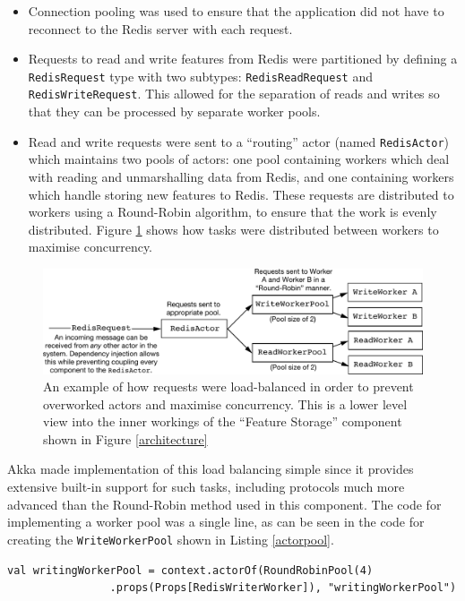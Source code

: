 \documentclass{l4proj}
\newcommand{\code}[1]{\texttt{#1}}
\begin{document}
        \begin{itemize}
        \item Connection pooling was used to ensure that the application did not have to reconnect to the Redis server with each request.
        \item Requests to read and write features from Redis were partitioned by defining a \code{RedisRequest} type with two subtypes: \code{RedisReadRequest} and \code{RedisWriteRequest}. This allowed for the separation of reads and writes so that they can be processed by separate worker pools.
        \item Read and write requests were sent to a ``routing'' actor (named \code{RedisActor}) which maintains two pools of actors: one pool containing workers which deal with reading and unmarshalling data from Redis, and one containing workers which handle storing new features to Redis. These requests are distributed to workers using a Round-Robin algorithm, to ensure that the work is evenly distributed. Figure \ref{loadbalancing} shows how tasks were distributed between workers to maximise concurrency.
        \end{itemize}


\begin{figure}
\centering
\includegraphics[scale=0.7]{loadbalancing.pdf}
\caption{An example of how requests were load-balanced in order to prevent overworked actors and maximise concurrency. This is a lower level view into the inner workings of the ``Feature Storage'' component shown in Figure \ref{architecture}}
\label{loadbalancing}
\end{figure}
        
        Akka made implementation of this load balancing simple since it provides extensive built-in support for such tasks, including protocols much more advanced than the Round-Robin method used in this component. The code for implementing a worker pool was a single line, as can be seen in the code for creating the \code{WriteWorkerPool} shown in Listing \ref{actorpool}.
        
        \begin{lstlisting}[caption=Creating an actor pool to reduce the work required by any single actor.,label=actorpool]
          val writingWorkerPool = context.actorOf(RoundRobinPool(4)
                .props(Props[RedisWriterWorker]), "writingWorkerPool")
        \end{lstlisting}
\end{document}
